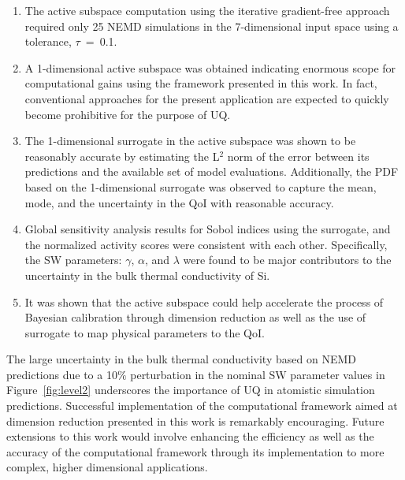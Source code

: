 \begin{enumerate}
\item The active subspace computation using the iterative gradient-free approach
required only 25 NEMD simulations in the 7-dimensional input space using a tolerance, 
$\tau$~=~0.1.

\item A 1-dimensional active subspace was obtained indicating enormous scope for
computational gains using the framework presented in this work. In fact, conventional
approaches for the present application are expected to quickly become prohibitive for
the purpose of UQ. 

\item The 1-dimensional surrogate in the active subspace was shown to be reasonably accurate
by estimating the L$^2$ norm of the error between its predictions and the available set of
model evaluations. Additionally, the PDF based on the 1-dimensional surrogate was 
observed to capture the mean, mode, and the uncertainty in the QoI with reasonable accuracy.

\item Global sensitivity analysis results for Sobol indices using the surrogate, and the
normalized activity scores were consistent with each other. Specifically, the SW parameters:
$\gamma$, $\alpha$, and $\lambda$ were found to be major contributors to the
uncertainty in the bulk thermal conductivity of Si.

\item It was shown that the active subspace could help accelerate the process
of Bayesian calibration through dimension reduction as well as the use of surrogate 
to map physical parameters to the QoI.    

\end{enumerate}
%
The large uncertainty in the bulk thermal conductivity based on NEMD predictions due to
a 10$\%$ perturbation in the nominal SW parameter values in Figure~\ref{fig:level2} underscores
the importance of UQ in atomistic simulation predictions. Successful implementation of the
computational framework aimed at dimension reduction presented in this work is remarkably
encouraging. Future extensions to this work would involve enhancing the efficiency as well
as the accuracy of the computational framework through its implementation to more complex,
higher dimensional applications. 
